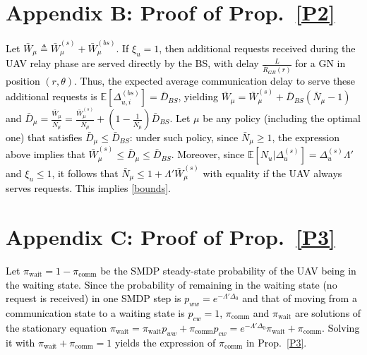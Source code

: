 \documentclass[12pt, draftcls, onecolumn]{IEEEtran}
\theoremstyle{plain}
\theoremstyle{definition}
\theoremstyle{remark}
\newcommand\hlt[1]{\textcolor{black}{#1}}
\begin{document}
\begin{appendices}
\section*{Appendix B: Proof of Prop.~\ref{P2}}\label{X2}
\hlt{Let $\bar{W}_{\mu}{\triangleq}\bar{W}_{\mu}^{(s)}{+}\bar{W}_{\mu}^{(bs)}$. If $\xi_{u}{=}1$, then additional requests received during the UAV relay phase are served directly by the BS, with delay $\frac{L}{\bar{R}_{GB}(r)}$ for a GN in position $(r,\theta)$. Thus, the expected average communication delay to serve these additional requests is $\mathbb{E}[\Delta_{u,i}^{(bs)}]{=}\bar{D}_{BS}$, yielding $\bar{W}_{\mu}{=}\bar{W}_{\mu}^{(s)}{+}\bar{D}_{BS}(\bar{N}_{\mu}{-}1)$ and $\bar{D}_{\mu}{=}\frac{\bar{W}_{\mu}}{\bar{N}_{\mu}}{=}\frac{\bar{W}_{\mu}^{(s)}}{\bar{N}_{\mu}}{+}\left(1{-}\frac{1}{\bar N_{\mu}}\right)\bar{D}_{BS}$. Let $\mu$ be any policy (including the optimal one) that satisfies $\bar{D}_{\mu}{\leq}\bar{D}_{BS}$: under such policy, since $\bar{N}_{\mu}{\geq}1$, the expression above implies that $\bar{W}_{\mu}^{(s)}{\leq}\bar{D}_{\mu}{\leq}\bar{D}_{BS}$. Moreover, since $\mathbb{E}[N_{u}|\Delta_{u}^{(s)}]{=}\Delta_{u}^{(s)}\Lambda'$ and $\xi_{u}{\leq}1$, it follows that $\bar{N}_{\mu}{\leq}1{+}\Lambda'\bar{W}_{\mu}^{(s)}$ with equality if the UAV always serves requests. This implies \eqref{bounds}.}
\vspace{-4mm}

\section*{Appendix C: Proof of Prop.~\ref{P3}}\label{X3}
\hlt{Let $\pi_{\mathrm{wait}}{=}1{-}\pi_{\mathrm{comm}}$ be the SMDP steady-state probability of the UAV being in the waiting state. Since the probability of remaining in the waiting state (no request is received) in one SMDP step is $p_{ww}{=}e^{-\Lambda'\Delta_{0}}$ and that of moving from a communication state to a waiting state is $p_{cw}{=}1$, $\pi_{\mathrm{comm}}$ and $\pi_{\mathrm{wait}}$ are solutions of the stationary equation
$\pi_{\mathrm{wait}} = \pi_{\mathrm{wait}}p_{ww} + \pi_{\mathrm{comm}}p_{cw}= e^{-\Lambda' \Delta_0}\pi_{\mathrm{wait}} + \pi_{\mathrm{comm}}$.
Solving it with $\pi_{\mathrm{wait}}{+}\pi_{\mathrm{comm}}{=}1$ yields the expression of $\pi_{\mathrm{comm}}$ in Prop.~\ref{P3}.}
\end{appendices}
\vspace{-12mm}



\end{document}

